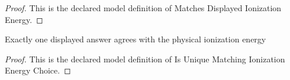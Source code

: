 \begin{proof}
  This is the declared model definition of Matches Displayed Ionization Energy.
\end{proof}
\begin{definition}
  \label{def:physics:phyx-mini-0644:phyxminiproblems-problemphyxmini0644-isuniquematchingionizationenergychoice}
  Exactly one displayed answer agrees with the physical ionization energy
\end{definition}
\begin{proof}
  This is the declared model definition of Is Unique Matching Ionization Energy Choice.
\end{proof}

